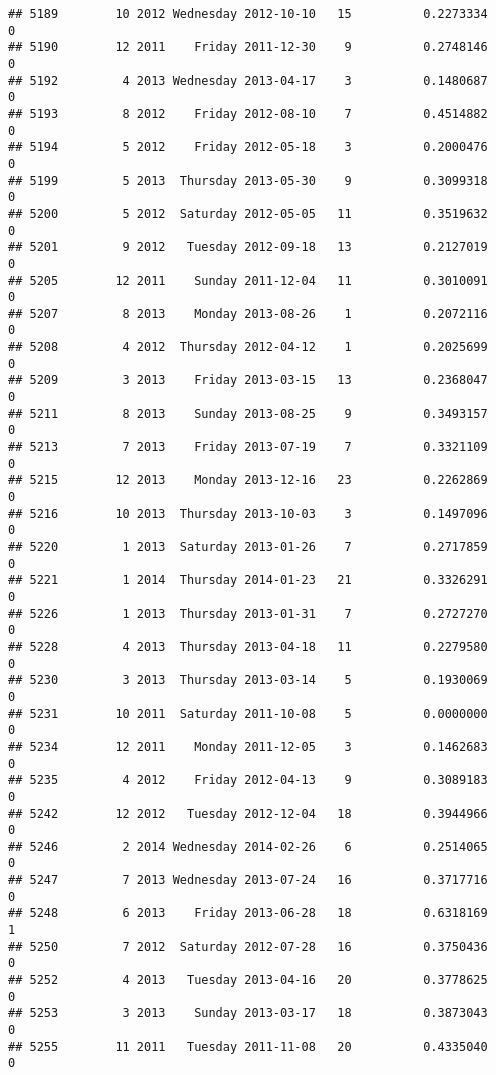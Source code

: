 \documentclass[
]{article}
\begin{document}
\begin{verbatim}
## 5189        10 2012 Wednesday 2012-10-10   15          0.2273334             0
## 5190        12 2011    Friday 2011-12-30    9          0.2748146             0
## 5192         4 2013 Wednesday 2013-04-17    3          0.1480687             0
## 5193         8 2012    Friday 2012-08-10    7          0.4514882             0
## 5194         5 2012    Friday 2012-05-18    3          0.2000476             0
## 5199         5 2013  Thursday 2013-05-30    9          0.3099318             0
## 5200         5 2012  Saturday 2012-05-05   11          0.3519632             0
## 5201         9 2012   Tuesday 2012-09-18   13          0.2127019             0
## 5205        12 2011    Sunday 2011-12-04   11          0.3010091             0
## 5207         8 2013    Monday 2013-08-26    1          0.2072116             0
## 5208         4 2012  Thursday 2012-04-12    1          0.2025699             0
## 5209         3 2013    Friday 2013-03-15   13          0.2368047             0
## 5211         8 2013    Sunday 2013-08-25    9          0.3493157             0
## 5213         7 2013    Friday 2013-07-19    7          0.3321109             0
## 5215        12 2013    Monday 2013-12-16   23          0.2262869             0
## 5216        10 2013  Thursday 2013-10-03    3          0.1497096             0
## 5220         1 2013  Saturday 2013-01-26    7          0.2717859             0
## 5221         1 2014  Thursday 2014-01-23   21          0.3326291             0
## 5226         1 2013  Thursday 2013-01-31    7          0.2727270             0
## 5228         4 2013  Thursday 2013-04-18   11          0.2279580             0
## 5230         3 2013  Thursday 2013-03-14    5          0.1930069             0
## 5231        10 2011  Saturday 2011-10-08    5          0.0000000             0
## 5234        12 2011    Monday 2011-12-05    3          0.1462683             0
## 5235         4 2012    Friday 2012-04-13    9          0.3089183             0
## 5242        12 2012   Tuesday 2012-12-04   18          0.3944966             0
## 5246         2 2014 Wednesday 2014-02-26    6          0.2514065             0
## 5247         7 2013 Wednesday 2013-07-24   16          0.3717716             0
## 5248         6 2013    Friday 2013-06-28   18          0.6318169             1
## 5250         7 2012  Saturday 2012-07-28   16          0.3750436             0
## 5252         4 2013   Tuesday 2013-04-16   20          0.3778625             0
## 5253         3 2013    Sunday 2013-03-17   18          0.3873043             0
## 5255        11 2011   Tuesday 2011-11-08   20          0.4335040             0

\end{verbatim}
\end{document}

